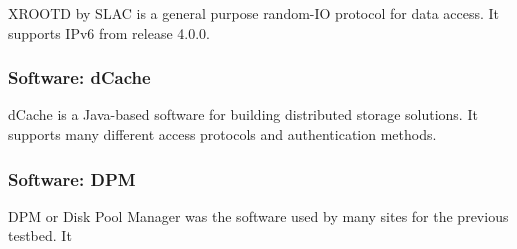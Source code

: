 XROOTD by SLAC is a general purpose random-IO protocol for data access. It supports IPv6 from release 4.0.0.


\subsubsection{Software: dCache} 

dCache is a Java-based software for building distributed storage solutions. It supports many different access protocols and authentication methods.

\subsubsection{Software: DPM} 

DPM or Disk Pool Manager was the software used by many sites for the previous testbed. It 
